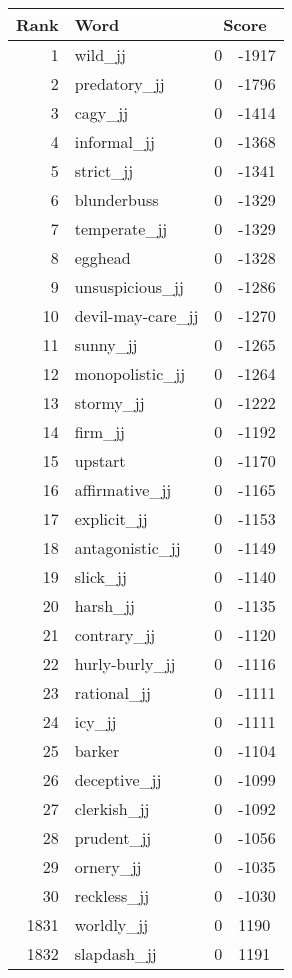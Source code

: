 \begin{longtable}[!htbp]{| rlr@{.}l |}
    \hline
    \textbf{Rank} & \textbf{Word} & \multicolumn{2}{c|}{\textbf{Score}} \\
    \hline
    \endhead
    1 & wild\_jj & 0 & -1917 \\
    2 & predatory\_jj & 0 & -1796 \\
    3 & cagy\_jj & 0 & -1414 \\
    4 & informal\_jj & 0 & -1368 \\
    5 & strict\_jj & 0 & -1341 \\
    6 & blunderbuss & 0 & -1329 \\
    7 & temperate\_jj & 0 & -1329 \\
    8 & egghead & 0 & -1328 \\
    9 & unsuspicious\_jj & 0 & -1286 \\
    10 & devil-may-care\_jj & 0 & -1270 \\
    11 & sunny\_jj & 0 & -1265 \\
    12 & monopolistic\_jj & 0 & -1264 \\
    13 & stormy\_jj & 0 & -1222 \\
    14 & firm\_jj & 0 & -1192 \\
    15 & upstart & 0 & -1170 \\
    16 & affirmative\_jj & 0 & -1165 \\
    17 & explicit\_jj & 0 & -1153 \\
    18 & antagonistic\_jj & 0 & -1149 \\
    19 & slick\_jj & 0 & -1140 \\
    20 & harsh\_jj & 0 & -1135 \\
    21 & contrary\_jj & 0 & -1120 \\
    22 & hurly-burly\_jj & 0 & -1116 \\
    23 & rational\_jj & 0 & -1111 \\
    24 & icy\_jj & 0 & -1111 \\
    25 & barker & 0 & -1104 \\
    26 & deceptive\_jj & 0 & -1099 \\
    27 & clerkish\_jj & 0 & -1092 \\
    28 & prudent\_jj & 0 & -1056 \\
    29 & ornery\_jj & 0 & -1035 \\
    30 & reckless\_jj & 0 & -1030 \\
    1831 & worldly\_jj & 0 & 1190 \\
    1832 & slapdash\_jj & 0 & 1191 \\

\end{longtable}
